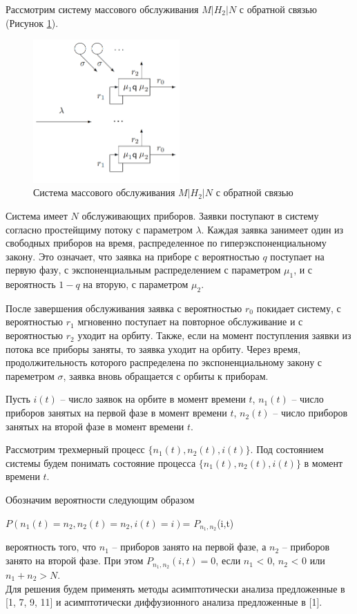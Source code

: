 Рассмотрим систему массового обслуживания $M|H_{2}|N$ с обратной связью (Рисунок \ref{fig:systemN}).

\begin{figure}[htbp]
	\centering
	\includegraphics[width=0.5\textwidth]{systemN}
	\caption{Система массового обслуживания $M|H_{2}|N$ с обратной связью}
	\label{fig:systemN}
\end{figure}


Система имеет $N$ обслуживающих приборов. Заявки поступают в систему согласно простейщиму потоку с параметром $\lambda$. Каждая заявка занимеет один из свободных приборов на время, распределенное по гиперэкспоненциальному закону. Это означает, что заявка на приборе с вероятностью $q$ поступает на первую фазу, с экспоненциальным распределением с параметром $\mu_{1}$, и с вероятность $1-q$ на вторую, с параметром $\mu_{2}$.

После завершения обслуживания заявка с вероятностью $r_{0}$ покидает систему, с вероятностью $r_{1}$ мгновенно поступает на повторное обслуживание и с вероятностью $r_{2}$ уходит на орбиту. Также, если на момент поступления заявки из потока все приборы заняты, то заявка уходит на орбиту. Через время, продолжительность которого распределена по экспоненциальному закону с пареметром $\sigma$, заявка вновь обращается с орбиты к приборам.

Пусть $i(t)$ -- число заявок на орбите в момент времени $t$, 
$n_{1}(t)$ -- число приборов занятых на первой фазе в момент времени $t$,
$n_{2}(t)$ -- число приборов занятых на второй фазе в момент времени $t$.

Рассмотрим трехмерный процесс $\{n_{1}(t), n_{2}(t), i(t)\}$. Под состоянием системы будем понимать состояние процесса $\{n_{1}(t), n_{2}(t), i(t)\}$ в момент времени $t$.

 Обозначим вероятности следующим образом \\
 \begin{center}
 	$P(n_{1}(t) = n_{2}, n_{2}(t)=n_{2}, i(t)=i)$= $P_{n_{1},n_{2}}$(i,t)\\
 \end{center}
вероятность того, что $n_{1}$ -- приборов занято на первой фазе, а $n_{2}$ -- приборов занято на второй фазе. При этом  $P_{n_{1},n_{2}}(i,t)=0$, если $n_{1}$ < 0, $n_{2}$ < 0 или $n_{1}+n_{2} > N.$\\

Для решения будем применять методы асимптотически анализа предложенные в [1, 7, 9, 11] и асимптотически диффузионного анализа предложенные в [1].


